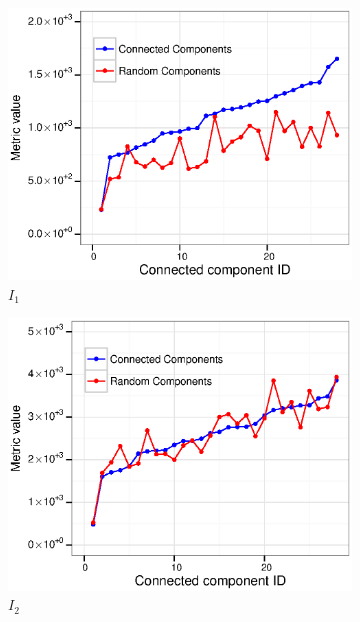 \begin{figure}
  \centering
  \begin{subfigure}[b]{0.3\textwidth}
    \includegraphics[width=\textwidth]{figures_supp/Plots_from_data/cc_validation/I1.eps}
    \caption{$I_1$} \label{fig:I1}
  \end{subfigure}
  \begin{subfigure}[b]{0.3\textwidth}
    \includegraphics[width=\textwidth]{figures_supp/Plots_from_data/cc_validation/I2.eps}
    \caption{$I_2$} \label{fig:I2}
  \end{subfigure} ~ %
  \begin{subfigure}[b]{0.3\textwidth}

\end{subfigure}
\end{figure}
